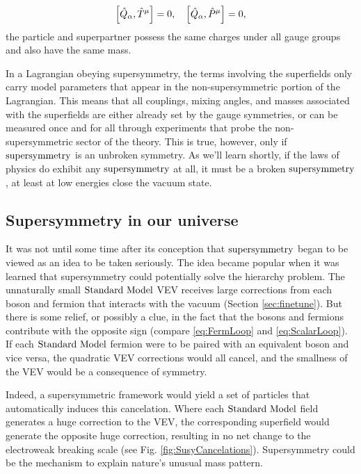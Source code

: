 \begin{equation}
\comm{\hat{Q}_{\alpha}}{\hat{T}^\mu}=0,\text{\ \ \ }\comm{\hat{Q}_\alpha}{\hat{P}^\mu}=0,
\end{equation}
the particle and superpartner possess the same charges under all gauge groups and also have the same mass. 

In a Lagrangian obeying supersymmetry, the terms involving the superfields only carry model parameters that appear in the non-supersymmetric portion of the Lagrangian. This means that all couplings, mixing angles, and masses associated with the superfields are either already set by the gauge symmetries, or can be measured once and for all through experiments that probe the non-supersymmetric sector of the theory. This is true, however, only if $\text{supersymmetry}$ is an unbroken symmetry. As we'll learn shortly, if the laws of physics do exhibit any $\text{supersymmetry}$ at all, it must be a broken $\text{supersymmetry}$, at least at low energies close the vacuum state.

\subsection{Supersymmetry in our universe}

It was not until some time after its conception that $\text{supersymmetry}$ began to be viewed as an idea to be taken seriously.  The idea became popular when it was learned that supersymmetry could potentially solve the hierarchy problem. The unnaturally small $\text{Standard\ Model}$ VEV receives large corrections from each boson and fermion that interacts with the vacuum (Section \ref{sec:finetune}). But there is some relief, or possibly a clue, in the fact that the bosons and fermions contribute with the opposite sign (compare \ref{eq:FermLoop} and \ref{eq:ScalarLoop}). If each $\text{Standard\ Model}$ fermion were to be paired with an equivalent boson and vice versa, the quadratic VEV corrections would all cancel, and the smallness of the VEV would be a consequence of symmetry.

Indeed, a supersymmetric framework would yield a set of particles that automatically induces this cancelation. Where each $\text{Standard\ Model}$ field generates a huge correction to the VEV,  the corresponding superfield would generate the opposite huge correction, resulting in no net change to the electroweak breaking scale (see Fig. \ref{fig:SusyCancelations}). Supersymmetry could be the mechanism to explain nature's unusual mass pattern.

